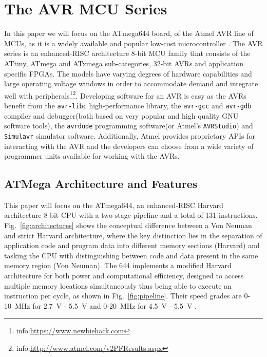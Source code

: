 \section{The AVR MCU Series}
\label{sec:atmega_overview}

	In this paper we will focus on the ATmega644 board, of the Atmel AVR line of MCUs, as it is a widely available and popular low-cost microcontroller \citep{glitches_paper} . The AVR series is an enhanced-RISC architecture 8-bit MCU family that consists of the ATtiny, ATmega and ATxmega sub-categories,  32-bit AVRs and application specific FPGAs\cite{book:practical_avr}. The models have varying degrees of hardware capabilities and large operating voltage windows in order to accommodate demand and integrate well with peripherals\footnote{info:\href{https://www.newbiehack.com/MicrocontrollersAlternativePowerreproduced froms.aspx}{https://www.newbiehack.com}}\footnote{info:\href{http://www.atmel.com/v2PFResults.aspx}{http://www.atmel.com/v2PFResults.aspx}}. Developing software for an AVR is easy as the AVRs benefit from the  \texttt{avr-libc} high-performance library, the \texttt{avr-gcc} and \texttt{avr-gdb} compiler and debugger(both based on very popular and high quality GNU software tools), the \texttt{avrdude} programming software(or Atmel's \texttt{AVRStudio}) and \texttt{Simulavr} simulator software. Additionally, Atmel provides proprietary APIs for interacting with the AVR and the developers can choose from a wide variety of programmer units available for working with the AVRs\cite{book:practical_avr}.
	
	\subsection{ATMega Architecture and Features}				

	This paper will focus on the ATmega644, an enhanced-RISC Harvard architecture 8-bit CPU with a two stage pipeline and a total of 131 instructions. Fig.~\ref{fig:architectures} shows the conceptual difference between a Von Neuman and strict Harvard architecture, where the key distinction lies in the separation of application code and program data into different memory sections (Harvard) and tasking the CPU with distinguishing between code and data present in the same memory region (Von Neuman). The 644 implements a modified Harvard architecture for both power and computational efficiency, designed to access multiple memory locations simultaneously thus being able to execute an instruction per cycle, as shown in Fig.~\ref{fig:pipeline}. Their speed grades are  0-10~MHz for 2.7~V - 5.5~V and 0-20~MHz for 4.5~V - 5.5~V \citep{atmega_manual}.

